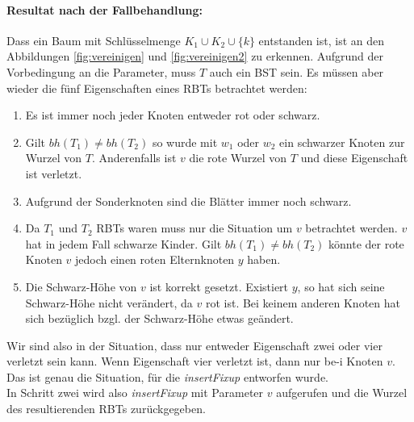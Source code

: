 \documentclass[a4paper,12pt]{article}
\begin{document}
\paragraph{Resultat nach der Fallbehandlung:}
Dass ein Baum mit Schlüsselmenge  $K_1 \cup K_2 \cup \{k\} $ entstanden ist, ist an den Abbildungen \ref{fig:vereinigen} und \ref{fig:vereinigen2} zu erkennen. Aufgrund der Vorbedingung an die Parameter, muss $T$ auch ein BST sein. Es müssen aber wieder die fünf Eigenschaften eines RBTs betrachtet werden:
\begin{enumerate}
	\item Es ist immer noch jeder Knoten entweder rot oder schwarz.
	\item Gilt $bh(T_1) \neq bh(T_2)$ so wurde mit $w_1$ oder $w_2$ ein schwarzer Knoten zur Wurzel von $T$. Anderenfalls ist $v$ die rote Wurzel von $T$ und diese Eigenschaft ist verletzt.   
	\item Aufgrund der Sonderknoten sind die Blätter immer noch schwarz.
	\item Da $T_1$ und $T_2$ RBTs waren muss nur die Situation um $v$ betrachtet werden. $v$ hat in jedem Fall schwarze Kinder. Gilt $bh(T_1) \neq bh(T_2)$ könnte der rote Knoten $v$ jedoch einen roten Elternknoten $y$ haben. 
	\item Die Schwarz-Höhe von $v$ ist korrekt gesetzt. Existiert $y$, so hat sich seine Schwarz-Höhe nicht verändert, da $v$ rot ist. Bei keinem anderen Knoten hat sich bezüglich bzgl. der Schwarz-Höhe etwas geändert. 
\end{enumerate} 
Wir sind also in der Situation, dass nur entweder Eigenschaft zwei oder vier verletzt sein kann. Wenn Eigenschaft vier verletzt ist, dann nur be-i Knoten $v$. Das ist genau die Situation, für die \textit{insertFixup} entworfen wurde.\\
In Schritt zwei wird also \textit{insertFixup} mit Parameter $v$ aufgerufen und die Wurzel des resultierenden RBTs zurückgegeben. 
\end{document}
